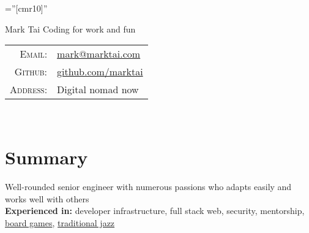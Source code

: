 \documentclass[a4paper,10pt]{article}
\begin{document}
\tracingall

\pagestyle{empty} %

\font\fb=''[cmr10]'' %



\begin{minipage}{0.7\textwidth}%
\par{
    {\fontsize{45}{50}\selectfont Mark Tai}
    \Large \hspace{.2em} Coding for work and fun
    }
\end{minipage}%
\hfill%
\begin{minipage}{0.3\textwidth}
\begin{tabular}{r|l}
    \textsc{Email:}     & \href{mailto:mark@marktai.com}{mark@marktai.com} \\
    \textsc{Github:}    & \href{https://www.github.com/marktai}{github.com/marktai}\\
    \textsc{Address:}   & Digital nomad now \\
\end{tabular}
\end{minipage} \\

\section{Summary}
\textbullet \hspace{.1em} Well-rounded senior engineer with numerous passions who adapts easily and works well with others \\
\textbullet \hspace{.1em} \textbf{Experienced in:} developer infrastructure, full stack web, security, mentorship, \href{http://mootropolis.marktai.com}{board games}, \href{http://marktai.com/s/16a8}{traditional jazz} \\

\end{document}

